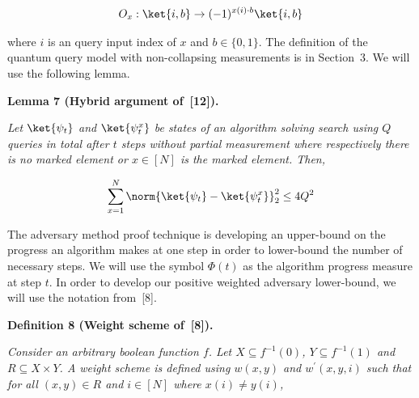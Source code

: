 \documentclass[10pt,a4paper]{article}
\begin{document}
\[\begin{gathered}
\displaystyle O_{x}:\ket{i,b}\rightarrow(-1)^{x(i)\cdot b}\ket{i,b}
\end{gathered}\]




where $i$ is an query input index of $x$ and $b\in\{0,1\}$. The definition of the quantum query model with non-collapsing measurements is in Section 3. We will use the following lemma.\par





\par\medskip\noindent\textbf{
\textbf{Lemma 7}\textbf{ }(Hybrid argument of [12])\textbf{.}
}\par



\emph{Let $\ket{\psi_{t}}$ and $\ket{\psi_{t}^{x}}$ be states of an algorithm solving search using $Q$ queries in total after $t$ steps without partial measurement where respectively there is no marked element or $x\in[N]$ is the marked element. Then,}\par


\[\begin{gathered}
\displaystyle\sum_{x=1}^{N}\norm{\ket{\psi_{t}}-\ket{\psi_{t}^{x}}}_{2}^{2}\leq 4Q^{2}
\end{gathered}\]






The adversary method proof technique is developing an upper-bound on the progress an algorithm makes at one step in order to lower-bound the number of necessary steps. We will use the symbol $\Phi(t)$ as the algorithm progress measure at step $t$. In order to develop our positive weighted adversary lower-bound, we will use the notation from [8].\par





\par\medskip\noindent\textbf{
\textbf{Definition 8}\textbf{ }(Weight scheme of [8])\textbf{.}
}\par



\emph{Consider an arbitrary boolean function $f$. Let $X\subseteq f^{-1}(0)$, $Y\subseteq f^{-1}(1)$ and $R\subseteq X\times Y$. A weight scheme is defined using $w(x,y)$ and $w^{\prime}(x,y,i)$ such that for all $(x,y)\in R$ and $i\in[N]$ where $x(i)\neq y(i)$,}\par
\end{document}
